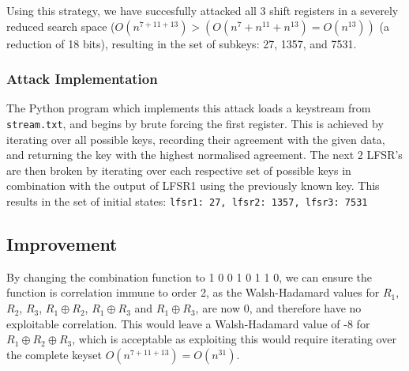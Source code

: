\documentclass[british,11pt,a4paper]{article}
\begin{document}
Using this strategy, we have succesfully attacked all 3 shift registers in a severely reduced search space (\(O(n^{7+11+13})>(O(n^{7}+n^{11}+n^{13})=O(n^{13}))\) (a reduction of 18 bits), resulting in the set of subkeys: 27, 1357, and 7531.

\subsubsection{Attack Implementation}
The Python program which implements this attack loads a keystream from \lstinline{stream.txt}, and begins by brute forcing the first register.
This is achieved by iterating over all possible keys, recording their agreement with the given data, and returning the key with the highest normalised agreement.
The next 2 LFSR's are then broken by iterating over each respective set of possible keys in combination with the output of LFSR1 using the previously known key.
This results in the set of initial states: \lstinline{lfsr1: 27, lfsr2: 1357, lfsr3: 7531}

\subsection{Improvement}
By changing the combination function to 1 0 0 1 0 1 1 0, we can ensure the function
is correlation immune to order 2, as the Walsh-Hadamard values for \(R_1\),
 \(R_2\),  \(R_3\),  \(R_1 \oplus R_2\), \(R_1 \oplus R_3\) and \(R_1 \oplus R_3\), are now 0,
 and therefore have no exploitable correlation. This would leave a Walsh-Hadamard value of
 -8 for \(R_1 \oplus R_2 \oplus R_3\), which is acceptable as exploiting this would require iterating over the complete keyset \(O(n^{7+11+13}) = O(n^{31})\).
\end{document}

